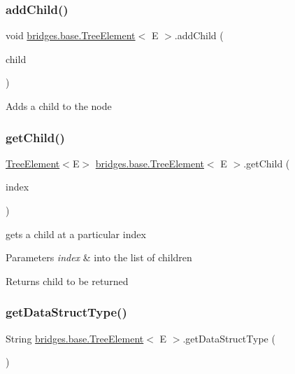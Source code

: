 \subsubsection{\texorpdfstring{add\+Child()}{addChild()}}
{\footnotesize\ttfamily void \hyperlink{classbridges_1_1base_1_1_tree_element}{bridges.\+base.\+Tree\+Element}$<$ E $>$.add\+Child (\begin{DoxyParamCaption}\item[{\hyperlink{classbridges_1_1base_1_1_tree_element}{Tree\+Element}$<$ E $>$}]{child }\end{DoxyParamCaption})}

Adds a child to the node \mbox{\label{classbridges_1_1base_1_1_tree_element_a4ee40d69ce52fdcac321554564d10aa3}} 
\subsubsection{\texorpdfstring{get\+Child()}{getChild()}}
{\footnotesize\ttfamily \hyperlink{classbridges_1_1base_1_1_tree_element}{Tree\+Element}$<$E$>$ \hyperlink{classbridges_1_1base_1_1_tree_element}{bridges.\+base.\+Tree\+Element}$<$ E $>$.get\+Child (\begin{DoxyParamCaption}\item[{int}]{index }\end{DoxyParamCaption})}

gets a child at a particular index


\begin{DoxyParams}{Parameters}
{\em index} & into the list of children\\
\hline
\end{DoxyParams}
\begin{DoxyReturn}{Returns}
child to be returned 
\end{DoxyReturn}
\mbox{\label{classbridges_1_1base_1_1_tree_element_a5e0d5f8991d72bd7b0e76d6b0b8662a7}} 
\subsubsection{\texorpdfstring{get\+Data\+Struct\+Type()}{getDataStructType()}}
{\footnotesize\ttfamily String \hyperlink{classbridges_1_1base_1_1_tree_element}{bridges.\+base.\+Tree\+Element}$<$ E $>$.get\+Data\+Struct\+Type (\begin{DoxyParamCaption}{ }\end{DoxyParamCaption})}

